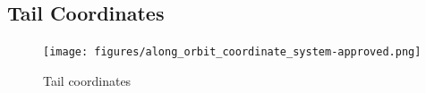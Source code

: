 \documentclass[]{aa}
\begin{document}



\begin{appendix}

  \section{Tail Coordinates} \label{appendix:TailCoordinates}

  \begin{figure}
    \centering
    \texttt{[image: figures/along\_orbit\_coordinate\_system-approved.png]}
    \caption{Tail coordinates}
    \label{fig:TailCoordinates}
  \end{figure}



\end{appendix}
\end{document}
